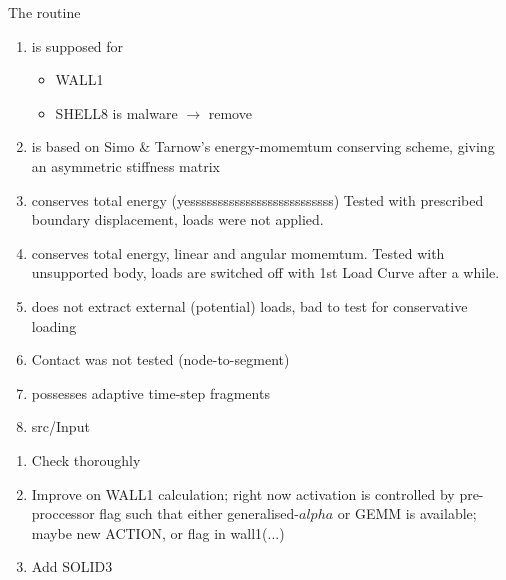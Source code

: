 The routine
\begin{enumerate}
\item is supposed for
  \begin{itemize}
  \item WALL1
  \item SHELL8 is malware $\to$ remove
  \end{itemize}
\item is based on Simo \& Tarnow's energy-momemtum conserving scheme, giving
  an asymmetric stiffness matrix 
\item conserves total energy (yessssssssssssssssssssssssss) Tested with
  prescribed boundary displacement, loads were not applied.
\item conserves total energy, linear and angular momemtum. Tested with
  unsupported body, loads are switched off with 1st Load Curve after a while. 
\item does not extract external (potential) loads, bad to test for
  conservative loading 
\item Contact was not tested (node-to-segment)
\item possesses adaptive time-step fragments
\item src/Input 
\end{enumerate}

\begin{enumerate}
\item Check thoroughly
\item Improve on WALL1 calculation; right now activation is controlled by
  pre-proccessor flag such that either generalised-$alpha$ or GEMM is
  available; maybe new ACTION, or flag in wall1(...)
\item Add SOLID3
\end{enumerate}

